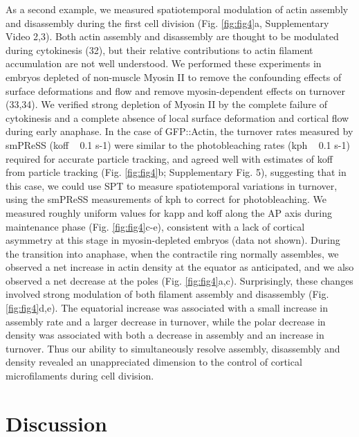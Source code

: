  As a second example, we measured spatiotemporal modulation of actin assembly and disassembly during the first cell division (Fig. \ref{fig:fig4}a, Supplementary Video 2,3). Both actin assembly and disassembly are thought to be modulated during cytokinesis (32), but their relative contributions to actin filament accumulation are not well understood. We performed these experiments in embryos depleted of non-muscle Myosin II to remove the confounding effects of surface deformations and flow and remove myosin-dependent effects on turnover (33,34). We verified strong depletion of Myosin II by the complete failure of cytokinesis and a complete absence of local surface deformation and cortical flow during early anaphase. In the case of GFP::Actin, the turnover rates measured by smPReSS (koff ~ 0.1 s-1) were similar to the photobleaching rates (kph ~ 0.1 s-1) required for accurate particle tracking, and agreed well with estimates of koff from particle tracking (Fig. \ref{fig:fig4}b; Supplementary Fig. 5), suggesting that in this case, we could use SPT to measure spatiotemporal variations in turnover, using the smPReSS measurements of kph to correct for photobleaching. We measured roughly uniform values for kapp and koff along the AP axis during maintenance phase (Fig. \ref{fig:fig4}c-e), consistent with a lack of cortical asymmetry at this stage in myosin-depleted embryos (data not shown). During the transition into anaphase, when the contractile ring normally assembles, we observed a net increase in actin density at the equator as anticipated, and we also observed a net decrease at the poles (Fig. \ref{fig:fig4}a,c). Surprisingly, these changes involved strong modulation of both filament assembly and disassembly (Fig. \ref{fig:fig4}d,e). The equatorial increase was associated with a small increase in assembly rate and a larger decrease in turnover, while the polar decrease in density was associated with both a decrease in assembly and an increase in turnover. Thus our ability to simultaneously resolve assembly, disassembly and density revealed an unappreciated dimension to the control of cortical microfilaments during cell division.
 
 
 \section{Discussion}
 
